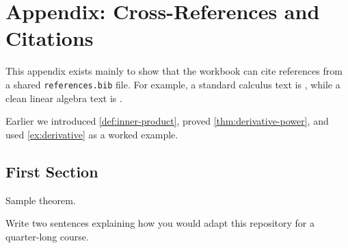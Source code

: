\chapter{Appendix: Cross-References and Citations}

This appendix exists mainly to show that the workbook can cite references from a shared
\texttt{references.bib} file. For example, a standard calculus text is \cite{apostol-calculus}, while a
clean linear algebra text is \cite{axler-linear}.

\begin{note}
Earlier we introduced \cref{def:inner-product}, proved \cref{thm:derivative-power}, and used
\cref{ex:derivative} as a worked example.
\end{note}

\section{First Section}
\begin{theo}{}
    Sample theorem.
\end{theo}

\begin{exercise}[Reflection]
Write two sentences explaining how you would adapt this repository for a quarter-long course.
\myskip
\end{exercise}
